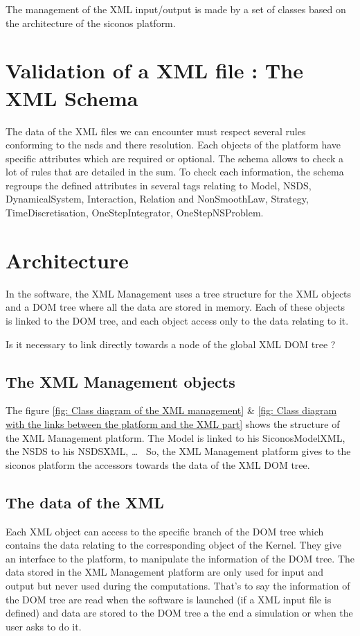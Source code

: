 

The management of the XML input/output is made by a set of classes based on the architecture of the
\ac{siconos} platform.


\section{Validation of a XML file : The XML Schema}
The data of the XML files we can encounter must respect several rules conforming to the \ac{nsds}
and there resolution. Each objects of the platform have specific attributes which are required
or optional. The schema allows to check a lot of rules that are detailed in the \ac{sum}.
To check each information, the schema regroups the defined attributes in several tags relating to
Model, NSDS, DynamicalSystem, Interaction, Relation and NonSmoothLaw, Strategy, TimeDiscretisation,
OneStepIntegrator, OneStepNSProblem.


\section{Architecture}
In the software, the XML Management uses a tree structure for the XML objects and a DOM tree where all the data are stored in memory. Each of these objects is linked to the DOM tree, and each object access only to the data relating to it.

\begin{ndr}
  Is it necessary to link directly towards a node of the global XML DOM tree ?
\end{ndr}

\subsection{The XML Management objects}
The figure \ref{fig: Class diagram of the XML management} \& \ref{fig: Class diagram with the links between the platform and the XML part} shows the structure of the XML Management platform.
The Model is linked to his SiconosModelXML, the NSDS to his NSDSXML, \dots~
 So, the XML Management platform gives to the \ac{siconos} platform the accessors towards the data of the XML DOM tree.

\subsection{The data of the XML}
Each XML object can access to the specific branch of the DOM tree which contains the data relating to
the corresponding object of the Kernel. They give an interface to the platform, to manipulate the information of
the DOM tree.
The data stored in the XML Management platform are only used for input and output but never used during the
computations. That's to say the information of the DOM tree are read when the software is launched (if a XML input file is
defined) and data are stored to the DOM tree a the end a simulation or when the user asks to do it.

